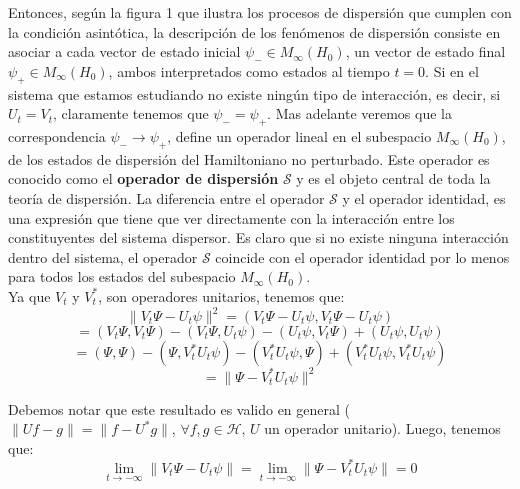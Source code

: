\documentclass[12pt]{book}
\numberwithin{equation}{chapter}
\def\S{\mathcal{S}}
\def\rar{\rightarrow}
\def\H{\mathcal{H}}
\begin{document}
Entonces, seg\'un la figura 1 que ilustra los procesos de dispersi\'on que cumplen con la condici\'on asint\'otica, la descripci\'on de los fen\'omenos de dispersi\'on consiste en asociar a cada vector de estado inicial $\psi_{-} \in M_{\infty}(H_{0})$, un vector de estado final $\psi_{+} \in M_{\infty}(H_{0}) $, ambos interpretados como estados al tiempo $t=0$. Si en el sistema que estamos estudiando no existe ning\'un tipo de interacci\'on, es decir, si $U_{t}=V_{t}$, claramente tenemos que $\psi_{-} = \psi_{+}$. Mas adelante veremos que la correspondencia $ \psi_{-} \rar \psi_{+} $, define un operador lineal en el subespacio $M_{\infty}(H_{0})$, de los estados de dispersi\'on del Hamiltoniano no perturbado. Este operador es conocido como el {\bf operador de dispersi\'on} $\S$ y es el objeto central de toda la teor\'ia de dispersi\'on. La diferencia entre el operador $\S$ y el operador identidad, es una expresi\'on que tiene que ver directamente con la interacci\'on entre los constituyentes del sistema dispersor. Es claro que si no existe ninguna interacci\'on dentro del sistema, el operador $\S$ coincide con el operador identidad por lo menos para todos los estados del subespacio $M_{\infty}(H_{0})$. \\

Ya que $V_{t}$ y $V_{t}^{*}$, son operadores unitarios, tenemos que:
$$ \| V_{t}\Psi - U_{t}\psi \|^{2}= ( V_{t}\Psi - U_{t}\psi , V_{t}\Psi - U_{t}\psi ) $$
$$= (V_{t}\Psi,V_{t}\Psi) - (V_{t}\Psi , U_{t}\psi) - (U_{t}\psi,V_{t}\Psi ) + (U_{t}\psi,U_{t}\psi) $$
$$= (\Psi , \Psi) - (\Psi ,V_{t}^{*} U_{t}\psi) - (V_{t}^{*} U_{t}\psi,\Psi ) + (V_{t}^{*}U_{t}\psi ,V_{t}^{*} U_{t}\psi) $$
$$ = \| \Psi - V_{t}^{*} U_{t}\psi \|^{2} $$

Debemos notar que este resultado es valido en general ( $\| Uf-g \|= \| f-U^{*}g \|$, $\forall f,g \in \H$, $U$ un operador unitario). Luego, tenemos que:
\begin{equation}\label{cas-2}
\lim_{t \rar -\infty} \| V_{t}\Psi - U_{t}\psi \| = \lim_{t \rar -\infty} \| \Psi - V_{t}^{*} U_{t}\psi \| =0
\end{equation}
\end{document}
